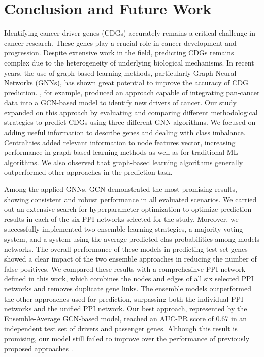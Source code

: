 \chapter{Conclusion and Future Work}
\label{sec:conclusion}

Identifying cancer driver genes (CDGs) accurately remains a critical challenge in cancer research. These genes play a crucial role in cancer development and progression. Despite extensive work in the field, predicting CDGs remains complex due to the heterogeneity of underlying biological mechanisms. In recent years, the use of graph-based learning methods, particularly Graph Neural Networks (GNNs), has shown great potential to improve the accuracy of CDG prediction. \citet{schulte2021integration}, for example, produced an approach capable of integrating pan-cancer data into a GCN-based model to identify new drivers of cancer. Our study expanded on this approach by evaluating and comparing different methodological strategies to predict CDGs using three different GNN algorithms. We focused on adding useful information to describe genes and dealing with class imbalance. Centralities added relevant information to node features vector, increasing performance in graph-based learning methods as well as for traditional ML algorithms. We also observed that graph-based learning algorithms generally outperformed other approaches in the prediction task.

Among the applied GNNs, GCN demonstrated the most promising results, showing consistent and robust performance in all evaluated scenarios. We carried out an extensive search for hyperparameter optimization to optimize prediction results in each of the six PPI networks selected for the study.
Moreover, we successfully implemented two ensemble learning strategies, a majority voting system, and a system using the average predicted clas probabilities among models networks. The overall performance of these models in predicting test set genes showed a clear impact of the two ensemble approaches in reducing the number of false positives. We compared these results with a comprehesinve PPI network defined in this work, which combines the nodes and edges of all six selected PPI networks and removes duplicate gene links. The ensemble models outperformed the other approaches used for prediction, surpassing both the individual PPI networks and the unified PPI network. Our best approach, represented by the Ensemble-Average GCN-based model, reached an AUC-PR score of 0.67 in an independent test set of drivers and passenger genes. Although this result is promising, our model still failed to improve over the performance of previously proposed approaches \cite{schulte2021integration}.

